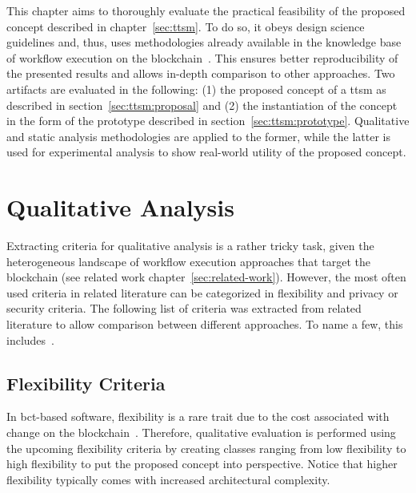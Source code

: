 \label{sec:evaluation}


This chapter aims to thoroughly evaluate the practical feasibility of the proposed concept described in chapter~\ref{sec:ttsm}. To do so, it obeys design science guidelines and, thus, uses methodologies already available in the knowledge base of workflow execution on the blockchain~\cite{hevner2004_design_science}. This ensures better reproducibility of the presented results and allows in-depth comparison to other approaches. Two artifacts are evaluated in the following: (1) the proposed concept of a \gls{ttsm} as described in section~\ref{sec:ttsm:proposal} and (2) the instantiation of the concept in the form of the prototype described in section~\ref{sec:ttsm:prototype}. Qualitative and static analysis methodologies are applied to the former, while the latter is used for experimental analysis to show real-world utility of the proposed concept.



\section{Qualitative Analysis}
\label{sec:evaluation:qualitative_analysis}
Extracting criteria for qualitative analysis is a rather tricky task, given the heterogeneous landscape of workflow execution approaches that target the blockchain (see related work chapter~\ref{sec:related-work}). However, the most often used criteria in related literature can be categorized in flexibility and privacy or security criteria. The following list of criteria was extracted from related literature to allow comparison between different approaches. To name a few, this includes~\cite{prybila_master_thesis,runtime_verification_for_bp_utilizing_bitcoin,blockchain_for_secure_io_bp,lean_architecture_for_blockchain_based_process_execution,architecture_for_multi_chain_bp_ladleif,untrusted_bp_execution_using_blockchain}.


\subsection{Flexibility Criteria}
\label{sec:evaluation:qualitative_analysis:flexibility_criteria}
In \gls{bct}-based software, flexibility is a rare trait due to the cost associated with change on the blockchain~\cite{nakamoto2009,buterin2020}. Therefore, qualitative evaluation is performed using the upcoming flexibility criteria by creating classes ranging from low flexibility to high flexibility to put the proposed concept into perspective. Notice that higher flexibility typically comes with increased architectural complexity.


